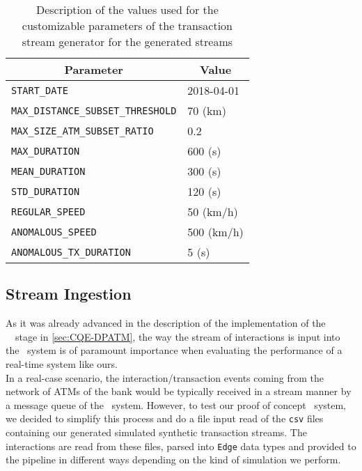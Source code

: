 \begin{table}[H]
\hspace*{-1cm}
\centering
\renewcommand{\arraystretch}{1.2} %
\begin{tabular}{|l|l|} %
\hline
\multicolumn{1}{|c|}{\textbf{Parameter}} & \multicolumn{1}{c|}{\textbf{Value}} \\ \hline
\texttt{START\_DATE} & 2018-04-01 \\ \hline
\texttt{MAX\_DISTANCE\_SUBSET\_THRESHOLD} & 70 (km)\\ \hline
\texttt{MAX\_SIZE\_ATM\_SUBSET\_RATIO} & 0.2\\ \hline
\texttt{MAX\_DURATION} & 600 (s)\\ \hline
\texttt{MEAN\_DURATION} & 300 (s) \\ \hline
\texttt{STD\_DURATION} & 120 (s) \\ \hline
\texttt{REGULAR\_SPEED} & 50 (km/h) \\ \hline
\texttt{ANOMALOUS\_SPEED} & 500 (km/h) \\ \hline
\texttt{ANOMALOUS\_TX\_DURATION} & 5 (s) \\ \hline
\end{tabular}
\caption{Description of the values used for the customizable parameters of the transaction stream generator for the generated streams}
\label{table:stream-generator-parameters-specific}
\end{table}

\subsection{Stream Ingestion}\label{exps-input-reading}

As it was already advanced in the description of the implementation of the \source\ \Sr\ stage in \ref{sec:CQE-DPATM}, the way the stream of interactions is input into the \DPATM\ system is of paramount importance when evaluating the performance of a real-time system like ours.\\

In a real-case scenario, the interaction/transaction events coming from the network of ATMs of the bank would be typically received in a stream manner by a message queue of the \DPATM\ system. However, to test our proof of concept \DPATM\ system, we decided to simplify this process and do a file input read of the \texttt{csv} files containing our generated simulated synthetic transaction streams. The interactions are read from these files, parsed into \texttt{Edge} data types and provided to the pipeline in different ways depending on the kind of simulation we perform. \\

